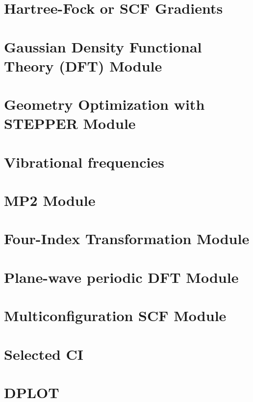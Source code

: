 \section{Hartree-Fock or SCF Gradients}


\section{Gaussian Density Functional Theory (DFT) Module}


\section{Geometry Optimization with STEPPER Module}

\section{Vibrational frequencies}


\section{MP2 Module}


\section{Four-Index Transformation Module} 


\section{Plane-wave periodic DFT Module}


\section{Multiconfiguration SCF Module}


\section{Selected CI}




\section{DPLOT}


